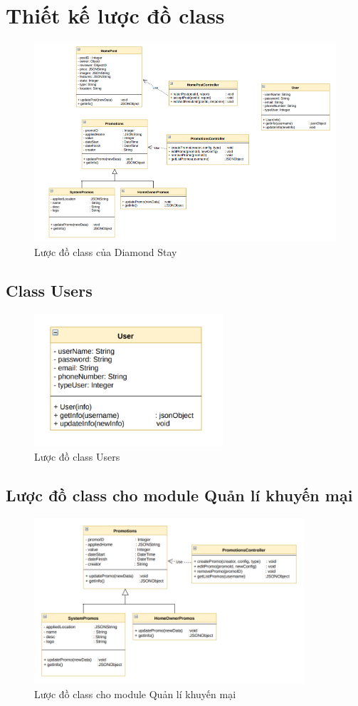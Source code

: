 \newpage 
\section{Thiết kế lược đồ class}
\begin{figure}[H]
	\centering
	\includegraphics[width=14cm]{Image/777.png}
	\vspace{0.5cm}
	\caption{Lược đồ class của Diamond Stay}
\end{figure}
\subsection{Class Users}
\begin{figure}[H]
	\centering
	\includegraphics[width=7cm]{Image/444.png}
	\vspace{0.5cm}
	\caption{Lược đồ class Users}
\end{figure}
\subsection{Lược đồ class cho module Quản lí khuyến mại}
\begin{figure}[H]
	\centering
	\includegraphics[width=10cm]{Image/555.png}
	\vspace{0.5cm}
	\caption{Lược đồ class cho module Quản lí khuyến mại}
\end{figure}
